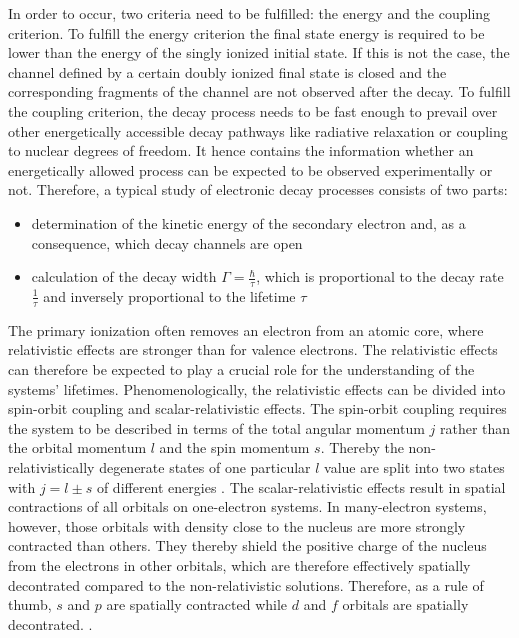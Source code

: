 In order to occur, two criteria need to be fulfilled: the energy and the coupling
criterion.
To fulfill the energy criterion the final state energy is required
to be lower than
the energy of the singly ionized initial state. If this is not the case, the
channel defined by a certain doubly ionized final state
is closed and the corresponding fragments of the
channel are not observed after the decay.
To fulfill the coupling criterion, the decay process needs to be fast enough
to prevail over other energetically accessible decay pathways like radiative
relaxation or coupling to nuclear degrees of freedom.
It hence contains
the information whether an energetically allowed process can be expected
to be observed experimentally or not.
Therefore, a typical study of electronic decay processes consists of two parts:
\begin{itemize}
 \item determination of the kinetic energy of the secondary electron
       and, as a consequence, which decay channels are open
 \item calculation of the decay width $\Gamma=\frac{\hbar}{\tau}$, which
       is proportional to the decay rate $\frac{1}{\tau}$ and
       inversely proportional to the lifetime $\tau$
\end{itemize}


The primary ionization often removes an electron from an atomic core, where
relativistic effects are stronger than for valence electrons. The relativistic
effects can therefore be expected to play a crucial role for the understanding
of the systems' lifetimes.
Phenomenologically, the relativistic effects can be divided  
into spin-orbit coupling and scalar-relativistic effects. The spin-orbit       
coupling requires the system to be described in terms of the total angular     
momentum $j$ rather than the orbital momentum $l$ and the spin momentum $s$.   
Thereby the non-relativistically degenerate states of one particular $l$       
value are split into two states with $j=l\pm s$ of different energies          
\cite{ReiherWolf09}.                                            
The scalar-relativistic effects result in spatial contractions of all orbitals on
one-electron systems. In many-electron systems, however, those orbitals with density close
to the nucleus are more strongly contracted than others. They thereby
shield the positive charge of the nucleus from the electrons in other orbitals,
which are therefore effectively spatially decontrated compared to the non-relativistic
solutions. Therefore, as a rule of thumb, $s$ and $p$ are spatially contracted while
$d$ and $f$ orbitals are spatially decontrated. \cite{ReiherWolf09}.

